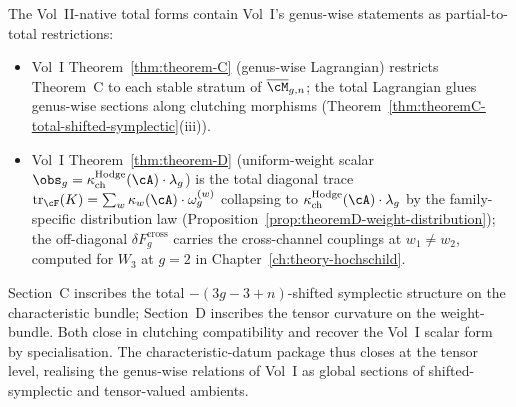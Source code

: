 The Vol~II-native total forms contain Vol~I's genus-wise statements
as partial-to-total restrictions:

\begin{itemize}
 \item Vol~I Theorem~\ref*{thm:theorem-C} (genus-wise Lagrangian)
 restricts Theorem~C to each stable stratum of
 $\overline{\cM}_{g,n}$; the total Lagrangian glues genus-wise
 sections along clutching morphisms
 (Theorem~\ref{thm:theoremC-total-shifted-symplectic}(iii)).
 \item Vol~I Theorem~\ref*{thm:theorem-D} (uniform-weight scalar
 $\obs_g = \kappaChHodge(\cA) \cdot \lambda_g$) is the total
 diagonal trace
 $\operatorname{tr}_\cF(K) = \sum_w \kappa_w(\cA) \cdot
 \omega_g^{(w)}$ collapsing to
 $\kappaChHodge(\cA) \cdot \lambda_g$ by the family-specific
 distribution law
 (Proposition~\ref{prop:theoremD-weight-distribution}); the
 off-diagonal $\delta F_g^{\mathrm{cross}}$ carries the
 cross-channel couplings at $w_1 \neq w_2$, computed for $W_3$ at
 $g = 2$ in Chapter~\ref{ch:theory-hochschild}.
\end{itemize}

Section~C inscribes the total $-(3g{-}3{+}n)$-shifted symplectic
structure on the characteristic bundle; Section~D inscribes the
tensor curvature on the weight-bundle. Both close in clutching
compatibility and recover the Vol~I scalar form by specialisation.
The characteristic-datum package thus closes at the tensor level,
realising the genus-wise relations of Vol~I as global sections of
shifted-symplectic and tensor-valued ambients.
